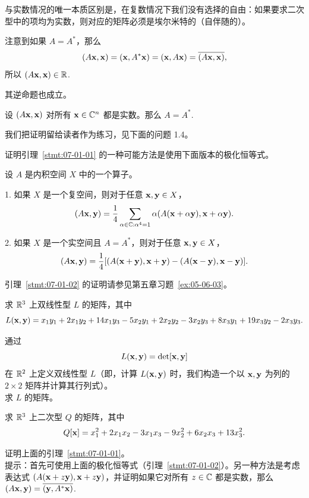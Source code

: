 与实数情况的唯一本质区别是，在复数情况下我们没有选择的自由：如果要求二次型中的项均为实数，则对应的矩阵必须是埃尔米特的（自伴随的）。

注意到如果 $A = A^*$，那么 $$(A\mathbf{x}, \mathbf{x}) = (\mathbf{x}, A^*\mathbf{x}) = (\mathbf{x}, A\mathbf{x}) = \overline{(A\mathbf{x}, \mathbf{x})},$$
所以 $(A\mathbf{x}, \mathbf{x}) \in \mathbb{R}$.~

其逆命题也成立。

\begin{lemma}\label{stmt:07-01-01}
设 $(A\mathbf{x}, \mathbf{x})$ 对所有 $\mathbf{x} \in \mathbb{C}^n$ 都是实数。那么 $A = A^*$.~\end{lemma}

我们把证明留给读者作为练习，见下面的问题 1.4。

证明引理~\ref{stmt:07-01-01} 的一种可能方法是使用下面版本的极化恒等式。

\begin{lemma}\label{stmt:07-01-02}
设 $A$ 是内积空间 $X$ 中的一个算子。

1. 如果 $X$ 是一个复空间，则对于任意 $\mathbf{x}, \mathbf{y} \in X$，
$$(A\mathbf{x}, \mathbf{y}) = \frac{1}{4} \sum_{\alpha \in \mathbb{C} : \alpha^4=1} \alpha(A(\mathbf{x} + \alpha \mathbf{y}), \mathbf{x} + \alpha \mathbf{y}).$$

2. 如果 $X$ 是一个实空间且 $A = A^*$，则对于任意 $\mathbf{x}, \mathbf{y} \in X$，
$$(A\mathbf{x}, \mathbf{y}) = \frac{1}{4} [(A(\mathbf{x} + \mathbf{y}), \mathbf{x} + \mathbf{y}) - (A(\mathbf{x} - \mathbf{y}), \mathbf{x} - \mathbf{y})].$$\end{lemma}

引理~\ref{stmt:07-01-02} 的证明请参见第五章习题~\ref{ex:05-06-03}。

\begin{problemset}
\item \label{ex:07-01-01} 求 $\mathbb{R}^3$ 上双线性型 $L$ 的矩阵，其中 $$L(\mathbf{x}, \mathbf{y}) = x_1y_1 + 2x_1y_2 + 14x_1y_3 - 5x_2y_1 + 2x_2y_2 - 3x_2y_3 + 8x_3y_1 + 19x_3y_2 - 2x_3y_3.$$
\item \label{ex:07-01-02} 通过 $$L(\mathbf{x}, \mathbf{y}) = \det[\mathbf{x}, \mathbf{y}]$$ 在 $\mathbb{R}^2$ 上定义双线性型 $L$（即，计算 $L(\mathbf{x}, \mathbf{y})$ 时，我们构造一个以 $\mathbf{x}, \mathbf{y}$ 为列的 $2 \times 2$ 矩阵并计算其行列式）。
\\
求 $L$ 的矩阵。
\item \label{ex:07-01-03} 求 $\mathbb{R}^3$ 上二次型 $Q$ 的矩阵，其中 $$Q[\mathbf{x}] = x_1^2 + 2x_1x_2 - 3x_1x_3 - 9x_2^2 + 6x_2x_3 + 13x_3^2.$$
\item \label{ex:07-01-04} 证明上面的引理~\ref{stmt:07-01-01}。
\\
{\heiti 提示}：首先可使用上面的极化恒等式（引理~\ref{stmt:07-01-02}）。另一种方法是考虑表达式 $(A(\mathbf{x} + z\mathbf{y}), \mathbf{x} + z\mathbf{y})$，并证明如果它对所有 $z \in \mathbb{C}$ 都是实数，那么 $(A\mathbf{x}, \mathbf{y}) = \overline{(\mathbf{y}, A^*\mathbf{x})}$.~
\end{problemset}

